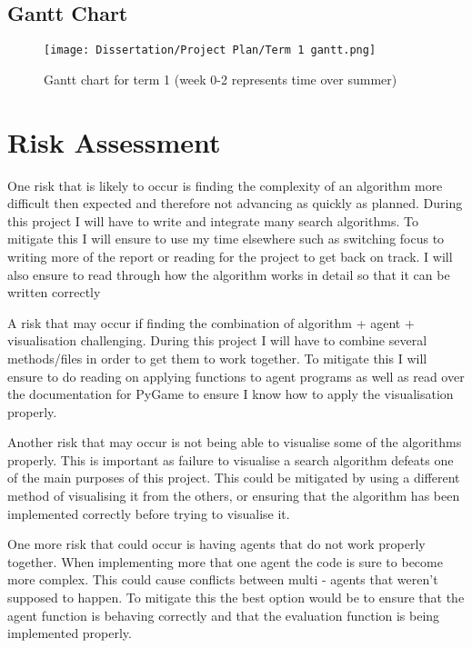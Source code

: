 \documentclass{article}
\begin{document}
\subsection{Gantt Chart}
\begin{figure}[hp]
\centering
\texttt{[image: Dissertation/Project Plan/Term 1 gantt.png]}

\caption{Gantt chart for term 1 (week 0-2 represents time over summer)}
\end{figure}


\newpage
\section{Risk Assessment}

One risk that is likely to occur is finding the complexity of an algorithm more difficult then expected and therefore not advancing as quickly as planned. During this project I will have to write and integrate many search algorithms. To mitigate this I will ensure to use my time elsewhere such as switching focus to writing more of the report or reading for the project to get back on track. I will also ensure to read through how the algorithm works in detail so that it can be written correctly
\bigbreak

A risk that may occur if finding the combination of algorithm + agent + visualisation challenging. During this project I will have to combine several methods/files in order to get them to work together. To mitigate this I will ensure to do reading on applying functions to agent programs as well as read over the documentation for PyGame to ensure I know how to apply the visualisation properly.
\bigbreak

Another risk that may occur is not being able to visualise some of the algorithms properly. This is important as failure to visualise a search algorithm defeats one of the main purposes of this project. This could be mitigated by using a different method of visualising it from the others, or ensuring that the algorithm has been implemented correctly before trying to visualise it. 
\bigbreak

One more risk that could occur is having agents that do not work properly together. When implementing more that one agent the code is sure to become more complex. This could cause conflicts between multi - agents that weren't supposed to happen. To mitigate this the best option would be to ensure that the agent function is behaving correctly and that the evaluation function is being implemented properly.
\end{document}
